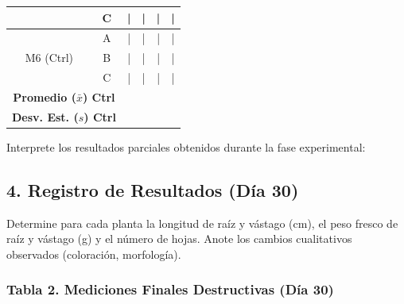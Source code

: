 \documentclass[
  spanish,
  10pt,
  letterpaper,
  twocolumn]{article}
\begin{document}
\begin{center}
{\begin{tabular}{c|c|c|c|c|c}
 & C & \quad | \quad & \quad | \quad & \quad | \quad & \quad | \quad \\
\hline
 & A & \quad | \quad & \quad | \quad & \quad | \quad & \quad | \quad \\
M6 (Ctrl) & B & \quad | \quad & \quad | \quad & \quad | \quad & \quad | \quad \\
 & C & \quad | \quad & \quad | \quad & \quad | \quad & \quad | \quad \\
\hline
\multicolumn{2}{c|}{\textbf{Promedio ($\bar{x}$) Ctrl}} & & & & \\
\multicolumn{2}{c|}{\textbf{Desv. Est. ($s$) Ctrl}} & & & & \\
\hline
\end{tabular}%
}
\end{center}

Interprete los resultados parciales obtenidos durante la fase
experimental:

\hrulefill

\hrulefill

\hrulefill

\hrulefill

\hrulefill

\subsection{4. Registro de Resultados (Día
30)}\label{registro-de-resultados-duxeda-30}

Determine para cada planta la longitud de raíz y vástago (cm), el peso
fresco de raíz y vástago (g) y el número de hojas. Anote los cambios
cualitativos observados (coloración, morfología).

\subsubsection{Tabla 2. Mediciones Finales Destructivas (Día
30)}\label{tabla-2.-mediciones-finales-destructivas-duxeda-30}
\end{document}
